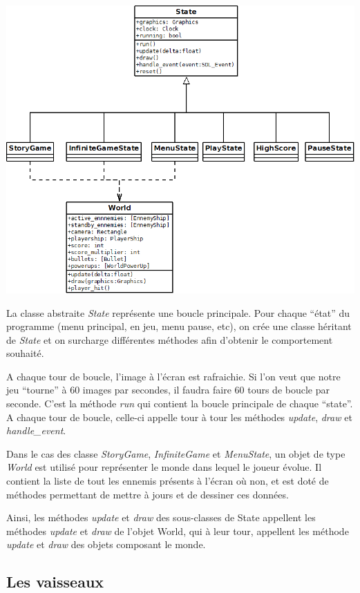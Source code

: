 \documentclass{article}
\begin{document}
\begin{center}
\includegraphics[scale=0.5]{images/dia_state.png}
\end{center}

La classe abstraite \emph{State} représente une boucle principale. Pour chaque
``état'' du programme (menu principal, en jeu, menu pause, etc), on crée une
classe héritant de \emph{State} et on surcharge différentes méthodes afin
d'obtenir le comportement souhaité.

A chaque tour de boucle, l'image à l'écran est rafraichie. Si l'on veut que
notre jeu ``tourne'' à 60 images par secondes, il faudra faire 60 tours de boucle
par seconde. C'est la méthode \emph{run} qui contient la boucle principale de
chaque ``state''. A chaque tour de boucle, celle-ci appelle tour à tour les
méthodes \emph{update}, \emph{draw} et \emph{handle\_event}.

Dans le cas des classe \emph{StoryGame}, \emph{InfiniteGame} et
\emph{MenuState}, un objet de type \emph{World} est utilisé pour représenter le
monde dans lequel le joueur évolue. Il contient la liste de tout les ennemis
présents à l'écran où non, et est doté de méthodes permettant de mettre à jours
et de dessiner ces données.

Ainsi, les méthodes \emph{update} et \emph{draw} des sous-classes de State
appellent les méthodes \emph{update} et \emph{draw} de l'objet World, qui à leur tour,
appellent les méthode \emph{update} et \emph{draw} des objets composant le monde.


\subsection{Les vaisseaux}
\end{document}
